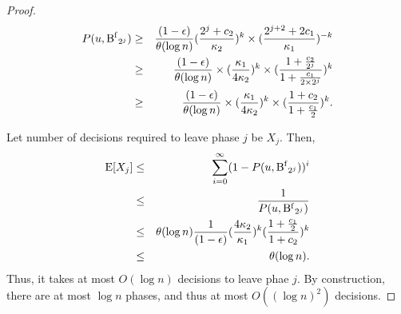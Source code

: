\begin{proof}
\begin{eqnarray*}
    P(u, \operatorname{B^{f}}_{2^{j}} ) &\ge& \frac{(1-\epsilon)}{\theta( \log n )} (\frac{2^{j}+c_2}{\kappa_2})^{k} \times (\frac{2^{j+2} + 2 c_1}{\kappa_1})^{-k} \\
    &\ge& \frac{(1-\epsilon)}{\theta( \log n )} \times (\frac{\kappa_1}{4\kappa_2} )^{k} \times ( \frac{ 1 + \frac{c_2}{2^{j}} }{ 1 + \frac{c_1}{2 \times 2^{j}} })^{k}\\
    &\ge& \frac{(1-\epsilon)}{\theta( \log n )} \times (\frac{\kappa_1}{4\kappa_2} )^{k} \times ( \frac{ 1 + c_2 }{ 1 + \frac{c_1}{2} })^{k} .\\
\end{eqnarray*}

Let number of decisions required to leave phase $j$ be $X_j$. Then, 
\begin{eqnarray*}
    \operatorname{E}[X_j] &\le& \sum_{i=0}^{\infty} (1 - P(u, \operatorname{B^{f}}_{2^{j}} ))^i \\
            &\le& \frac{1}{P(u, \operatorname{B^{f}}_{2^{j}} )} \\
            &\le& \theta( \log n ) \frac{1}{(1-\epsilon)} (\frac{4 \kappa_2}{\kappa_1})^{k} ( \frac{ 1 + \frac{c_1}{2} }{ 1 + c_2 })^{k}\\
            &\le& \theta( \log n ).
\end{eqnarray*}
Thus, it takes at most $O(\log n)$ decisions to leave phae $j$. By construction, there are at most $\log n$
phases, and thus at most $O((\log n)^2)$ decisions.
\end{proof}

